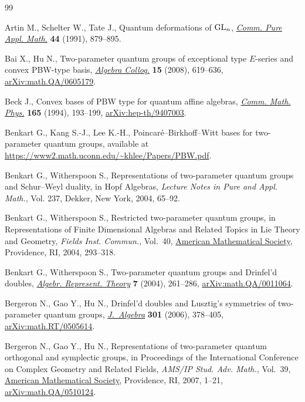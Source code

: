 \documentclass[10pt,a4paper]{amsart}
\numberwithin{equation}{section}
\begin{document}
\begin{thebibliography}{99}
\footnotesize\itemsep=0pt

Artin M., Schelter W., Tate J., Quantum deformations of {${\rm GL}_n$},
 \href{https://doi.org/10.1002/cpa.3160440804}{\textit{Comm. Pure Appl.
 Math.}} \textbf{44} (1991), 879--895.

Bai X., Hu N., Two-parameter quantum groups of exceptional type {$E$}-series
 and convex {PBW}-type basis,
 \href{https://doi.org/10.1142/S100538670800059X}{\textit{Algebra Colloq.}}
 \textbf{15} (2008), 619--636,
 \href{http://arxiv.org/abs/math.QA/0605179}{arXiv:math.QA/0605179}.

Beck J., Convex bases of {PBW} type for quantum affine algebras,
 \href{https://doi.org/10.1007/BF02099742}{\textit{Comm. Math. Phys.}}
 \textbf{165} (1994), 193--199,
 \href{http://arxiv.org/abs/hep-th/9407003}{arXiv:hep-th/9407003}.

Benkart G., Kang S.-J., Lee K.-H., Poincar\'e--{B}irkhoff--{W}itt bases for
 two-parameter quantum groups, {a}vailable at
 \url{https://www2.math.uconn.edu/~khlee/Papers/PBW.pdf}.

Benkart G., Witherspoon S., Representations of two-parameter quantum groups and
 {S}chur--{W}eyl duality, in Hopf Algebras, \textit{Lecture Notes in Pure and
 Appl. Math.}, Vol. 237, Dekker, New York, 2004, 65--92.

Benkart G., Witherspoon S., Restricted two-parameter quantum groups, in
 Representations of Finite Dimensional Algebras and Related Topics in {L}ie
 Theory and Geometry, \textit{Fields Inst. Commun.}, Vol.~40,
 \href{https://doi.org/10.1090/fic/040/15}{American Mathematical Society},
 Providence, RI, 2004, 293--318.

Benkart G., Witherspoon S., Two-parameter quantum groups and {D}rinfel'd
 doubles,
 \href{https://doi.org/10.1023/B:ALGE.0000031151.86090.2e}{\textit{Algebr.
 Represent. Theory}} \textbf{7} (2004), 261--286,
 \href{http://arxiv.org/abs/math.QA/0011064}{arXiv:math.QA/0011064}.

Bergeron N., Gao Y., Hu N., Drinfel'd doubles and {L}usztig's symmetries of
 two-parameter quantum groups,
 \href{https://doi.org/10.1016/j.jalgebra.2005.08.030}{\textit{J.~Algebra}}
 \textbf{301} (2006), 378--405,
 \href{http://arxiv.org/abs/math.RT/0505614}{arXiv:math.RT/0505614}.

Bergeron N., Gao Y., Hu N., Representations of two-parameter quantum orthogonal
 and symplectic groups, in Proceedings of the {I}nternational {C}onference on
 {C}omplex {G}eometry and {R}elated {F}ields, \textit{AMS/IP Stud. Adv.
 Math.}, Vol.~39, \href{https://doi.org/10.1090/amsip/039/01}{American
 Mathematical Society}, Providence, RI, 2007, 1--21,
 \href{http://arxiv.org/abs/math.QA/0510124}{arXiv:math.QA/0510124}.


\end{thebibliography}
\end{document}
